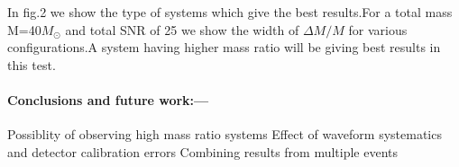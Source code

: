 \documentclass[prl,preprintnumbers,twocolumn,eqsecnum,floatfix,a4paper,nofootinbib,superscriptaddress]{revtex4}
\begin{document}
In fig.2 we show the type of systems which give the best results.For a total mass M=40$M_{\odot}$ and total SNR of 25 we show the width of $\Delta M/M$ for various configurations.A system having higher mass ratio will be giving best results in this test.

\paragraph{Conclusions and future work:---} 
Possiblity of observing high mass ratio systems 
Effect of waveform systematics and detector calibration errors 
Combining results from multiple events

%


\end{document}
